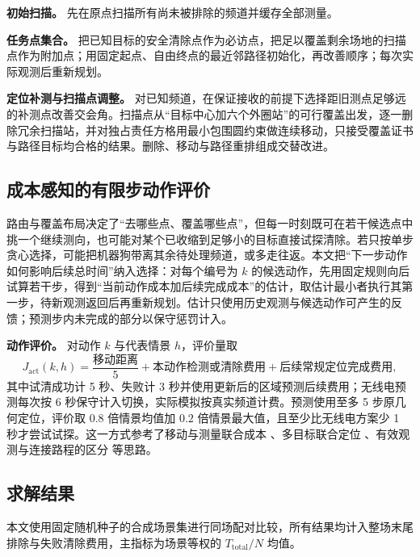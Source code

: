 \documentclass[UTF8,a4paper,zihao=-4,fontset=none]{ctexart}
\begin{document}
\textbf{初始扫描。} 先在原点扫描所有尚未被排除的频道并缓存全部测量。

\textbf{任务点集合。} 把已知目标的安全清除点作为必访点，把足以覆盖剩余场地的扫描点作为附加点；用固定起点、自由终点的最近邻路径初始化，再改善顺序；每次实际观测后重新规划。

\textbf{定位补测与扫描点调整。} 对已知频道，在保证接收的前提下选择距旧测点足够远的补测点改善交会角。扫描点从“目标中心加六个外圈站”的可行覆盖出发，逐一删除冗余扫描站，并对独占责任方格用最小包围圆约束做连续移动，只接受覆盖证书与路径目标均合格的结果。删除、移动与路径重排组成交替改进。

\subsection{成本感知的有限步动作评价}

路由与覆盖布局决定了“去哪些点、覆盖哪些点”，但每一时刻既可在若干候选点中挑一个继续测向，也可能对某个已收缩到足够小的目标直接试探清除。若只按单步贪心选择，可能把机器狗带离其余待处理频道，或多走往返。本文把“下一步动作如何影响后续总时间”纳入选择：对每个编号为 \(k\) 的候选动作，先用固定规则向后试算若干步，得到“当前动作成本加后续完成成本”的估计，取估计最小者执行其第一步，待新观测返回后再重新规划。估计只使用历史观测与候选动作可产生的反馈；预测步内未完成的部分以保守惩罚计入。

\textbf{动作评价。} 对动作 \(k\) 与代表情景 \(h\)，评价量取
\begin{equation}
  J_{\mathrm{act}}(k,h)=\frac{\text{移动距离}}{5}+\text{本动作检测或清除费用}+\text{后续常规定位完成费用},
  \label{eq:q3-action}
\end{equation}
其中试清成功计 5 秒、失败计 3 秒并使用更新后的区域预测后续费用；无线电预测每次按 6 秒保守计入切换，实际模拟按真实频道计费。预测使用至多 5 步原几何定位，评价取 \(0.8\) 倍情景均值加 \(0.2\) 倍情景最大值，且至少比无线电方案少 1 秒才尝试试探。这一方式参考了移动与测量联合成本 \cite{VanderHook2014}、多目标联合定位 \cite{Engin2020}、有效观测与连接路程的区分 \cite{Song2012} 等思路。

\subsection{求解结果}

本文使用固定随机种子的合成场景集进行同场配对比较，所有结果均计入整场末尾排除与失败清除费用，主指标为场景等权的 \(T_{\mathrm{total}}/N\) 均值。
\end{document}
